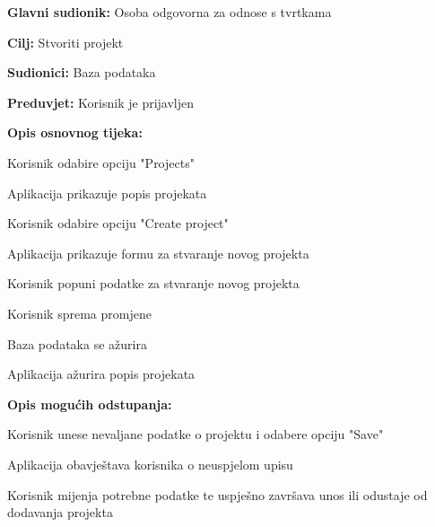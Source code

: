 					\noindent {}
					\begin{packed_item}

						\item \textbf{Glavni sudionik:} Osoba odgovorna za odnose s tvrtkama
						\item \textbf{Cilj:} Stvoriti projekt
						\item \textbf{Sudionici:} Baza podataka
						\item \textbf{Preduvjet:} Korisnik je prijavljen
						\item \textbf{Opis osnovnog tijeka:}

						\item[] \begin{packed_enum}

							\item Korisnik odabire opciju "Projects"
							\item Aplikacija prikazuje popis projekata
							\item Korisnik odabire opciju "Create project"
							\item Aplikacija prikazuje formu za stvaranje novog projekta
							\item Korisnik popuni podatke za stvaranje novog projekta
							\item Korisnik sprema promjene
							\item Baza podataka se ažurira
							\item Aplikacija ažurira popis projekata
						\end{packed_enum}

						\item \textbf{Opis mogućih odstupanja:}

						\item[] \begin{packed_item}

							\item[7.b] Korisnik unese nevaljane podatke o projektu i odabere opciju "Save"
							\item[] \begin{packed_enum}

								\item Aplikacija obavještava korisnika o neuspjelom upisu
								\item Korisnik mijenja potrebne podatke te uspješno završava unos ili
								odustaje od dodavanja projekta

							\end{packed_enum}

						\end{packed_item}
					\end{packed_item}

